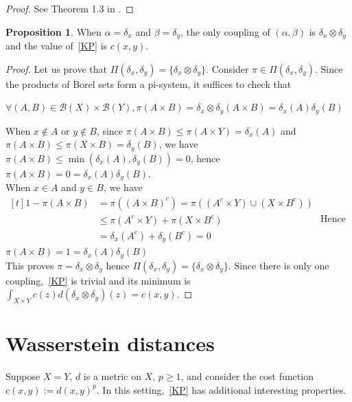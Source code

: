 \documentclass[12pt]{report}
\theoremstyle{definition}
\newtheorem{prop}[defi]{Proposition}
\theoremstyle{remark}
\begin{document}
\begin{proof}
	See Theorem 1.3 in \cite{villani2003topics}.
\end{proof}

\begin{prop}\label{diracs}
	When $\alpha=\delta_x$ and  $\beta=\delta_y$, the only coupling of $(\alpha,\beta)$ is $\delta_x\otimes \delta_y$ and the value of~\eqref{KP} is $c(x,y)$.
\end{prop}

\begin{proof}
	Let us prove that $\Pi(\delta_x, \delta_y)=\{\delta_x\otimes \delta_y\}$. Consider $\pi\in \Pi(\delta_x, \delta_y)$. Since the products of Borel sets form a pi-system, it suffices to check that \begin{center}$\forall (A,B)\in \mathcal B(X)\times \mathcal B(Y), \pi(A\times B)=\delta_x\otimes \delta_y(A\times B)=\delta_x(A) \delta_y(B)$\end{center}
	When $x\notin A$ or $y\notin B$, since $\pi(A\times B)\leq \pi(A\times Y) = \delta_x(A)$ and $\pi(A\times B)\leq \pi(X\times B) = \delta_y(B)$, we have $\pi(A\times B) \leq \min(\delta_x(A),\delta_y(B))= 0$, hence $\pi(A\times B) = 0 = \delta_x(A) \delta_y(B)$.\\
	When $x\in A$ and $y\in B$, we have $\begin{aligned}[t] 1-\pi(A\times B) &= \pi((A\times B)^c) 
	= \pi((A^c\times Y)\cup (X\times B^c))\\
	&\leq \pi(A^c\times Y) + \pi(X\times B^c)\\
	&= \delta_x(A^c) + \delta_y(B^c)
	= 0
	\end{aligned}$
	Hence $\pi(A\times B)=1=\delta_x(A) \delta_y(B)$\\
	This proves $\pi=\delta_x\otimes \delta_y$ hence $\Pi(\delta_x, \delta_y)=\{\delta_x\otimes \delta_y\}$.
	Since there is only one coupling,~\eqref{KP} is trivial and its minimum is $\int_{X\times Y} c(z)d(\delta_x\otimes \delta_y)(z) = c(x,y)$.
\end{proof}


\section{Wasserstein distances}

\hspace{\parindent} Suppose $X=Y$, $d$ is a metric on $X$, $p\geq 1$, and consider the cost function \\$c(x,y):=d(x,y)^p$. In this setting,~\eqref{KP} has additional interesting properties.
\end{document}
